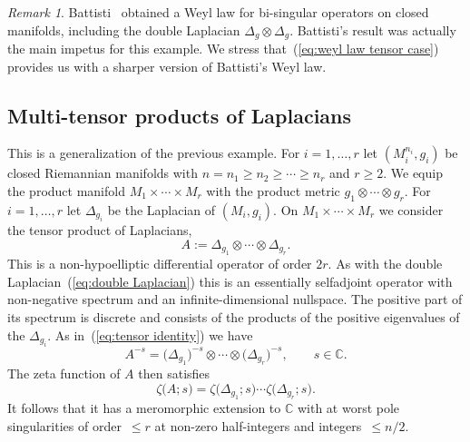 \documentclass[10pt, a4paper]{amsart}
\newcommand{\C}{\mathbb{C}}
\numberwithin{equation}{section}
\theoremstyle{definition}
\theoremstyle{remark}
\newtheorem{remark}[theorem]{Remark}
\begin{document}
\begin{remark}
 Battisti~\cite{Ba:MZ12} obtained a Weyl law for bi-singular operators on closed manifolds, including the double Laplacian $\Delta_g\otimes \Delta_g$. Battisti's result was actually the main impetus for this example. We stress that~(\ref{eq:weyl law tensor case}) provides us with a sharper version of Battisti's Weyl law. 
\end{remark}

\subsection{Multi-tensor products of Laplacians}
This is a generalization of the previous example.  For $i=1,\ldots, r$ let $(M_i^{n_i},g_i)$ be closed Riemannian manifolds with $n=n_1\geq n_2\geq \cdots \geq n_r$ and $r\geq 2$. We equip the product manifold $M_1\times \cdots \times M_r$ with the product metric $g_1\otimes \cdots \otimes g_r$. For $i=1,\ldots, r$ let $\Delta_{g_i}$ be the Laplacian of $(M_i,g_i)$. On $M_1\times \cdots \times M_r$ we consider the tensor product of Laplacians,
\begin{equation*}
A:=\Delta_{g_1}\otimes \cdots \otimes \Delta_{g_r}.
\end{equation*}
This is a non-hypoelliptic differential operator of order $2r$. As with the double Laplacian~(\ref{eq:double Laplacian}) this is an essentially selfadjoint operator with non-negative spectrum and an infinite-dimensional nullspace. The positive part of its spectrum is discrete and consists of the products of the positive eigenvalues of the $\Delta_{g_i}$. As in~(\ref{eq:tensor identity}) we have
\begin{equation*}
A^{-s}= \big(\Delta_{g_1}\big)^{-s}\otimes \cdots \otimes \big(\Delta_{g_r}\big)^{-s}, \qquad s\in\mathbb{C}.
\end{equation*}
The zeta function of $A$ then satisfies
\begin{equation*}
 \zeta\big(A;s\big)=  \zeta\big( \Delta_{g_1};s\big)\cdots  \zeta\big( \Delta_{g_r};s\big).
\end{equation*}
It follows that it has a meromorphic extension to $\C$ with at worst pole singularities of order~$\leq r$ at non-zero half-integers and integers~$\leq n/2$.
\end{document}
